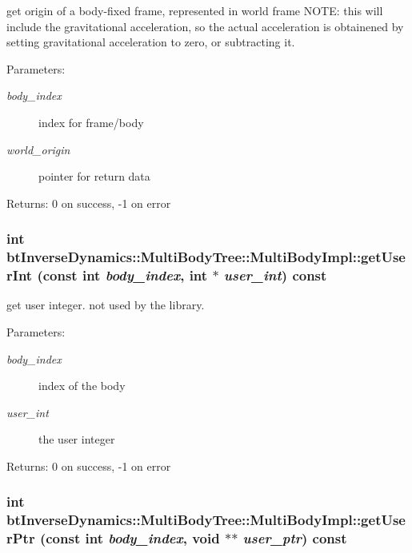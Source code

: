 get origin of a body-fixed frame, represented in world frame NOTE: this will include the gravitational acceleration, so the actual acceleration is obtainened by setting gravitational acceleration to zero, or subtracting it. \begin{Desc}
\item[Parameters:]
\begin{description}
\item[{\em body\_\-index}]index for frame/body \item[{\em world\_\-origin}]pointer for return data \end{description}
\end{Desc}
\begin{Desc}
\item[Returns:]0 on success, -1 on error \end{Desc}
 \hypertarget{classbt_inverse_dynamics_1_1_multi_body_tree_1_1_multi_body_impl_8deabb1a28e38824027d3515a655cdd3}{
\subsubsection[getUserInt]{\setlength{\rightskip}{0pt plus 5cm}int btInverseDynamics::MultiBodyTree::MultiBodyImpl::getUserInt (const int {\em body\_\-index}, \/  int $\ast$ {\em user\_\-int}) const}}
\label{classbt_inverse_dynamics_1_1_multi_body_tree_1_1_multi_body_impl_8deabb1a28e38824027d3515a655cdd3}


get user integer. not used by the library. \begin{Desc}
\item[Parameters:]
\begin{description}
\item[{\em body\_\-index}]index of the body \item[{\em user\_\-int}]the user integer \end{description}
\end{Desc}
\begin{Desc}
\item[Returns:]0 on success, -1 on error \end{Desc}
 \hypertarget{classbt_inverse_dynamics_1_1_multi_body_tree_1_1_multi_body_impl_53ffec14bf9450a22e881b75f80d8495}{
\subsubsection[getUserPtr]{\setlength{\rightskip}{0pt plus 5cm}int btInverseDynamics::MultiBodyTree::MultiBodyImpl::getUserPtr (const int {\em body\_\-index}, \/  void $\ast$$\ast$ {\em user\_\-ptr}) const}}
\label{classbt_inverse_dynamics_1_1_multi_body_tree_1_1_multi_body_impl_53ffec14bf9450a22e881b75f80d8495}



